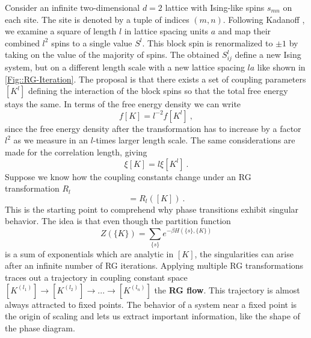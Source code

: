 	Consider an infinite two-dimensional $d=2$ lattice with Ising-like spins $s_{mn}$ on each site. The site is denoted by a tuple of indices $(m,n)$. Following Kadanoff \cite{kadanoff1966scaling}, we examine a square of length $l$ in lattice spacing units $a$ and map  their combined $l^2$ spins to a single value $S^l$. This block spin is renormalized to $\pm 1$ by taking on the value of the majority of spins. The obtained $S_{ij}^l$ define a new Ising system, but on a different length scale with a new lattice spacing $la$ like shown in \autoref{Fig::RG-Iteration}. The proposal is that there exists a set of coupling parameters $[K^l]$ defining the interaction of the block spins so that the total free energy stays the same. In terms of the free energy density we can write
	\begin{equation} \label{free-energy-density}
		f[K] =	l^{-2} f[K^l]~,
	\end{equation}
	since the free energy density after the transformation has to increase by a factor $l^2$ as we measure in an $l$-times larger length scale. The same considerations are made for the correlation length, giving
	\begin{equation}
		\xi[K] = l \xi[K^l]~.
	\end{equation}
	Suppose we know how the coupling constants change under an RG transformation $R_l$
	\begin{equation}
		[K^l] =	R_l([K])~.
	\end{equation}
	This is the starting point to comprehend why phase transitions exhibit singular behavior. The idea is that even though the partition function
	\begin{equation}
		Z(\{K\})	= \sum_{\{s\}} e^{- \beta H(\{s\}, \{K\})}
	\end{equation}
	is a sum of exponentials which are analytic in $[K]$, the singularities can arise after an infinite number of RG iterations. Applying multiple RG transformations traces out a trajectory in coupling constant space $[K^{(l_1)}] \rightarrow [K^{(l_2)}]  \rightarrow ... \rightarrow [K^{(l_n)}]$ the \textbf{RG flow}. This trajectory is almost always attracted to fixed points. The behavior of a system near a fixed point is the origin of scaling and lets us extract important information, like the shape of the phase diagram.

